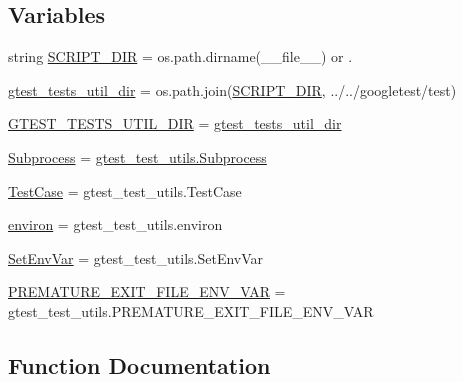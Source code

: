 \subsection*{Variables}
\begin{DoxyCompactItemize}
\item 
string \mbox{\hyperlink{namespacegmock__test__utils_a4ef94affd9d889f78d67be80017eeddd}{S\+C\+R\+I\+P\+T\+\_\+\+D\+IR}} = os.\+path.\+dirname(\+\_\+\+\_\+file\+\_\+\+\_\+) or \textquotesingle{}.\textquotesingle{}
\item 
\mbox{\hyperlink{namespacegmock__test__utils_af6d94170502149e7f99cfa73ddc13c00}{gtest\+\_\+tests\+\_\+util\+\_\+dir}} = os.\+path.\+join(\mbox{\hyperlink{namespacegmock__test__utils_a4ef94affd9d889f78d67be80017eeddd}{S\+C\+R\+I\+P\+T\+\_\+\+D\+IR}}, \textquotesingle{}../../googletest/test\textquotesingle{})
\item 
\mbox{\hyperlink{namespacegmock__test__utils_ae7ee9324ba489b3cbd99c5e26006eba9}{G\+T\+E\+S\+T\+\_\+\+T\+E\+S\+T\+S\+\_\+\+U\+T\+I\+L\+\_\+\+D\+IR}} = \mbox{\hyperlink{namespacegmock__test__utils_af6d94170502149e7f99cfa73ddc13c00}{gtest\+\_\+tests\+\_\+util\+\_\+dir}}
\item 
\mbox{\hyperlink{namespacegmock__test__utils_a31a0e33565ec805d314cb0a4eb8317e6}{Subprocess}} = \mbox{\hyperlink{classgtest__test__utils_1_1Subprocess}{gtest\+\_\+test\+\_\+utils.\+Subprocess}}
\item 
\mbox{\hyperlink{namespacegmock__test__utils_a959c5af591e4d49b6d35745205b64509}{Test\+Case}} = gtest\+\_\+test\+\_\+utils.\+Test\+Case
\item 
\mbox{\hyperlink{namespacegmock__test__utils_a6f0938b5e8839ebc847b52a38f4d35e3}{environ}} = gtest\+\_\+test\+\_\+utils.\+environ
\item 
\mbox{\hyperlink{namespacegmock__test__utils_ab0c69f8ce649fdd5a17f99deedf3eb29}{Set\+Env\+Var}} = gtest\+\_\+test\+\_\+utils.\+Set\+Env\+Var
\item 
\mbox{\hyperlink{namespacegmock__test__utils_a9392c288e6da3024d65ec0bddc0d86c3}{P\+R\+E\+M\+A\+T\+U\+R\+E\+\_\+\+E\+X\+I\+T\+\_\+\+F\+I\+L\+E\+\_\+\+E\+N\+V\+\_\+\+V\+AR}} = gtest\+\_\+test\+\_\+utils.\+P\+R\+E\+M\+A\+T\+U\+R\+E\+\_\+\+E\+X\+I\+T\+\_\+\+F\+I\+L\+E\+\_\+\+E\+N\+V\+\_\+\+V\+AR
\end{DoxyCompactItemize}


\subsection{Function Documentation}
\mbox{\label{namespacegmock__test__utils_a9146f81ff42389086b3eaee25dbf0263}} 
